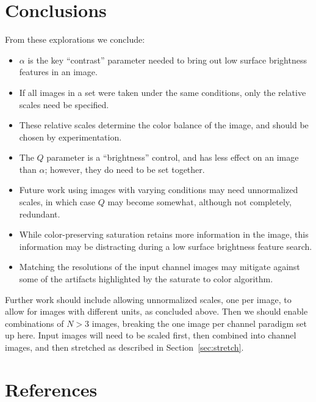 \documentclass[letterpaper, 11pt]{article}
\begin{document}
\section{Conclusions}
\label{sec:conclude}

From these explorations we conclude:
\begin{itemize}
\item $\alpha$ is the key ``contrast'' parameter needed to bring out low
surface brightness features in an image.
\item If all images in a set were taken under the same conditions, only the
relative scales need be specified.
\item These relative scales determine the color balance of the image, and
should be chosen by experimentation.
\item The $Q$ parameter is a ``brightness'' control, and has less effect on an
image than $\alpha$; however, they do need to be set together.
\item Future work using images with varying conditions may need unnormalized
scales, in which case $Q$ may become somewhat, although not completely, 
redundant.
\item While color-preserving saturation retains more information in the image,
this information may be distracting during a low surface brightness feature
search.
\item Matching the resolutions of the input channel images may mitigate
against some of the artifacts highlighted by the saturate to color algorithm.
\end{itemize}

Further work should include allowing unnormalized scales, one per image, to
allow for images with different units, as concluded above. Then we should
enable combinations of $N > 3$ images, breaking the one image per channel
paradigm set up here. Input images will need to be scaled first, then combined
into channel images, and then stretched as described in
Section~\ref{sec:stretch}.

\section{References}



\end{document}
